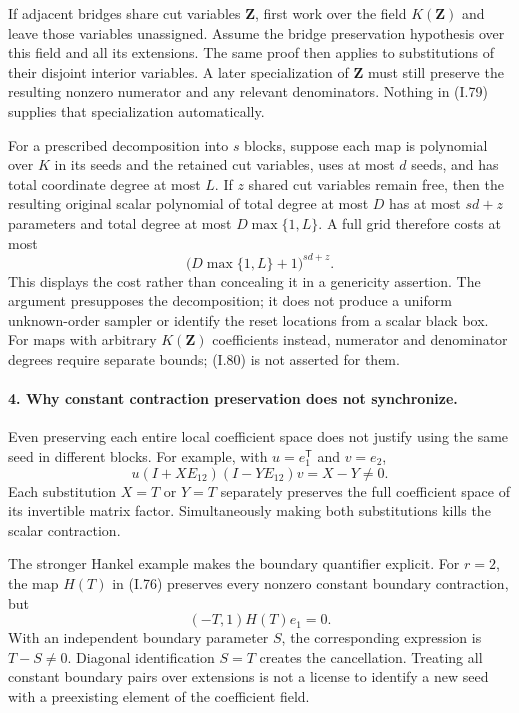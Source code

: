 If adjacent bridges share cut variables $\mathbf Z$, first work
over the field $K(\mathbf Z)$ and leave those variables unassigned.
Assume the bridge preservation hypothesis over this field and all
its extensions. The same proof then applies to substitutions of
their disjoint interior variables. A later specialization of $\mathbf Z$ must still preserve
the resulting nonzero numerator and any relevant denominators.
Nothing in (I.79) supplies that specialization automatically.

For a prescribed decomposition into $s$ blocks, suppose each map
is polynomial over $K$ in its seeds and the retained cut variables,
uses at most $d$ seeds, and has total coordinate degree at most $L$.
If $z$ shared cut variables remain free, then the resulting
original scalar polynomial of total degree at most $D$ has at most
$sd+z$ parameters and total degree at most $D\max\{1,L\}$.
A full grid therefore costs at most
\[
 \bigl(D\max\{1,L\}+1\bigr)^{sd+z}.
 \tag{I.80}
\]
This displays the cost rather than concealing it in a genericity
assertion. The argument presupposes the decomposition; it does not
produce a uniform unknown-order sampler or identify the reset
locations from a scalar black box. For maps with arbitrary
$K(\mathbf Z)$ coefficients instead, numerator and denominator
degrees require separate bounds; (I.80) is not asserted for them.

\paragraph{4. Why constant contraction preservation does not synchronize.}
Even preserving each entire local coefficient space does not justify
using the same seed in different blocks. For example, with
$u=e_1^{\mathsf T}$ and $v=e_2$,
\[
 u(I+XE_{12})(I-YE_{12})v=X-Y\ne0.
 \tag{I.81}
\]
Each substitution $X=T$ or $Y=T$ separately preserves the full
coefficient space of its invertible matrix factor. Simultaneously
making both substitutions kills the scalar contraction.

The stronger Hankel example makes the boundary quantifier explicit.
For $r=2$, the map $H(T)$ in (I.76) preserves every nonzero constant
boundary contraction, but
\[
 (-T,1)H(T)e_1=0.
 \tag{I.82}
\]
With an independent boundary parameter $S$, the corresponding
expression is $T-S\ne0$. Diagonal identification $S=T$ creates the
cancellation. Treating all constant boundary pairs over extensions
is not a license to identify a new seed with a preexisting element
of the coefficient field.

